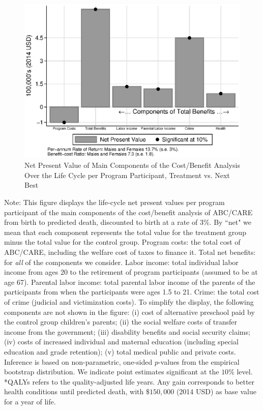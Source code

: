 \documentclass[static]{JJH-Beamer}
\begin{document}
\clearpage

\begin{frame}

\begin{figure}[H]
\caption{Net Present Value of Main Components of the Cost/Benefit Analysis Over the Life Cycle per Program Participant, Treatment vs. Next Best}\label{figure:main}
\begin{center}
\includegraphics[width=.75\columnwidth]{output/abccare_npvssummredux.eps}
\end{center}
\end{figure}

\end{frame}

\vspace{-16mm}
{\flushleft \small Note: This figure displays the life-cycle net present values per program participant of the main components of the cost/benefit analysis of ABC/CARE from birth to predicted death, discounted to birth at a rate of 3\%. By ``net" we mean that each component represents the total value for the treatment group minus the total value for the control group. Program costs: the total cost of ABC/CARE, including the welfare cost of taxes to finance it. Total net benefits: for \textit{all} of the components we consider. Labor income: total individual labor income from ages 20 to the retirement of program participants (assumed to be at age 67). Parental labor income: total parental labor income of the parents of the participants from when the participants were ages 1.5 to 21. Crime: the total cost of crime (judicial and victimization costs). To simplify the display, the following components are not shown in the figure: (i) cost of alternative preschool paid by the control group children's parents; (ii) the social welfare costs of transfer income from the government; (iii) disability benefits and social security claims; (iv) costs of increased individual and maternal education (including special education and grade retention); (v) total medical public and private costs. Inference is based on non-parametric, one-sided $p$-values from the empirical bootstrap distribution. We indicate point estimates significant at the $10\%$ level.\\
*QALYs refers to the quality-adjusted life years. Any gain corresponds to better health conditions until predicted death, with $\$150,000$ (2014 USD) as base value for a year of life.\\}
\end{document}
